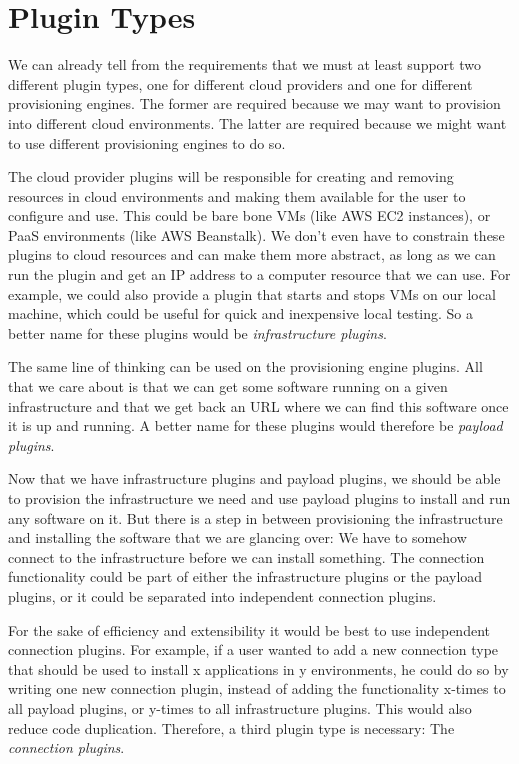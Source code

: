 \section{Plugin Types}
\label{design:plugins}

We can already tell from the requirements that we must at least support two different plugin types, one for different cloud providers and one for different provisioning engines.
The former are required because we may want to provision into different cloud environments.
The latter are required because we might want to use different provisioning engines to do so.

The cloud provider plugins will be responsible for creating and removing resources in cloud environments and making them available for the user to configure and use.
This could be bare bone VMs (like AWS EC2 instances), or PaaS environments (like AWS Beanstalk).
We don't even have to constrain these plugins to cloud resources and can make them more abstract, as long as we can run the plugin and get an IP address to a computer resource that we can use.
For example, we could also provide a plugin that starts and stops VMs on our local machine, which could be useful for quick and inexpensive local testing.
So a better name for these plugins would be \textit{infrastructure plugins}.

The same line of thinking can be used on the provisioning engine plugins.
All that we care about is that we can get some software running on a given infrastructure and that we get back an URL where we can find this software once it is up and running.
A better name for these plugins would therefore be \textit{payload plugins}.

Now that we have infrastructure plugins and payload plugins, we should be able to provision the infrastructure we need and use payload plugins to install and run any software on it.
But there is a step in between provisioning the infrastructure and installing the software that we are glancing over: We have to somehow connect to the infrastructure before we can install something.
The connection functionality could be part of either the infrastructure plugins or the payload plugins, or it could be separated into independent connection plugins.

For the sake of efficiency and extensibility it would be best to use independent connection plugins.
For example, if a user wanted to add a new connection type that should be used to install x applications in y environments, he could do so by writing one new connection plugin, instead of adding the functionality x-times to all payload plugins, or y-times to all infrastructure plugins.
This would also reduce code duplication.
Therefore, a third plugin type is necessary: The \textit{connection plugins}.

